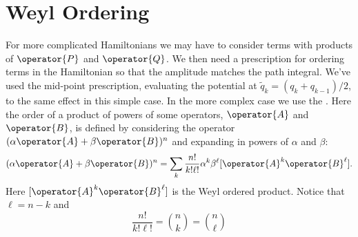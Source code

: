 \documentclass[fleqn]{NotesClass}
\begin{document}
    \section{Weyl Ordering}
    For more complicated Hamiltonians we may have to consider terms with products of \(\operator{P}\) and \(\operator{Q}\).
    We then need a prescription for ordering terms in the Hamiltonian so that the amplitude matches the path integral.
    We've used the mid-point prescription, evaluating the potential at \(\tilde{q}_k = (q_{k} + q_{k-1})/2\), to the same effect in this simple case.
    In the more complex case we use the .
    Here the order of a product of powers of some operators, \(\operator{A}\) and \(\operator{B}\), is defined by considering the operator \((\alpha\operator{A} + \beta\operator{B})^n\) and expanding in powers of \(\alpha\) and \(\beta\):
    \begin{equation}
        (\alpha\operator{A} + \beta\operator{B})^n = \sum_k \frac{n!}{k!\ell!} \alpha^k \beta^\ell [\operator{A}^k\operator{B}^\ell].
    \end{equation}
    Here \([\operator{A}^k\operator{B}^\ell]\) is the Weyl ordered product.
    Notice that \(\ell = n - k\) and
    \begin{equation}
        \frac{n!}{k!\ell!} = \binom{n}{k} = \binom{n}{\ell}
    \end{equation}
    
\end{document}

